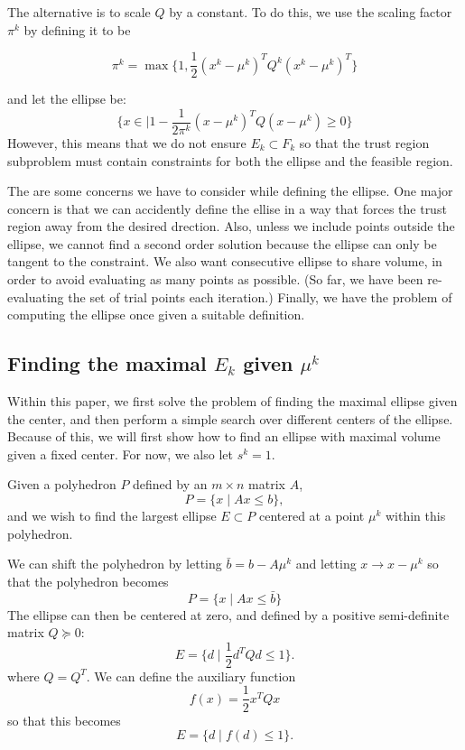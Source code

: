 \documentclass{article}
\begin{document}
The alternative is to scale $Q$ by a constant.
To do this, we use the scaling factor $\pi^k$ by defining it to be

$$\pi^k = \max \{1, \frac 1 {2} (x^{k} - \mu^{k})^T Q^k (x^{k} - \mu^{k})^T \}$$

and let the ellipse be:
$$\{x \in \mathbb | 1 - \frac 1 {2\pi^k} (x - \mu^{k})^T Q (x - \mu^{k}) \ge 0\} $$
However, this means that we do not ensure $E_k \subset F_k$ so that the trust region subproblem must contain constraints for both the ellipse and the feasible region.


The are some concerns we have to consider while defining the ellipse.
One major concern is that we can accidently define the ellise in a way that forces the trust region away from the desired drection.
Also, unless we include points outside the ellipse, we cannot find a second order solution because the ellipse can only be tangent to the constraint.
We also want consecutive ellipse to share volume, in order to avoid evaluating as many points as possible.
(So far, we have been re-evaluating the set of trial points each iteration.)
Finally, we have the problem of computing the ellipse once given a suitable definition.


\subsection{Finding the maximal $E_k$ given $\mu^k$}

Within this paper, we first solve the problem of finding the maximal ellipse given the center, and then perform a simple search over different centers of the ellipse.
Because of this, we will first show how to find an ellipse with maximal volume given a fixed center.
For now, we also let $s^k = 1$.

Given a polyhedron $P$ defined by an $m \times n$ matrix $A$,
\[
P = \{ x \; | \;  Ax \le b \},
\]
and we wish to find the largest ellipse $E \subset P$ centered at a point $\mu^{k}$ within this polyhedron.

We can shift the polyhedron by letting $\bar{b} = b - A\mu^{k}$ and letting $x \to x - \mu^{k}$ so that the polyhedron becomes
\[
P = \{ x \; | \;  Ax \le \bar{b} \}
\]
The ellipse can then be centered at zero, and defined by a positive semi-definite matrix $Q \succeq 0$:
\[
E = \{ d \; | \; \frac 1 2 d^T Q d \le 1 \}.
\]
where $Q = Q^T$.
We can define the auxiliary function 
\[
f(x) = \frac 1 2 x^T Q x
\]
so that this becomes
\[
E = \{ d \; | \; f(d) \le 1 \}.
\]
\end{document}
